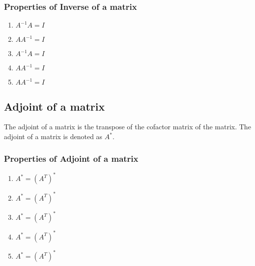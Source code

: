 \documentclass[titlepage,a4paper]{article}
\begin{document}
		\subsubsection{Properties of Inverse of a matrix}
			\begin{enumerate}
				\item $A^{-1}A=I$
				\item $AA^{-1}=I$
				\item $A^{-1}A=I$
				\item $AA^{-1}=I$
				\item $AA^{-1}=I$
			\end{enumerate}
	
	\subsection{Adjoint of a matrix}
		The adjoint of a matrix is the transpose of the cofactor matrix of the matrix. The adjoint of a matrix is denoted as $A^*$.
		\subsubsection{Properties of Adjoint of a matrix}
			\begin{enumerate}
				\item $A^* = (A^T)^*$
				\item $A^* = (A^T)^*$
				\item $A^* = (A^T)^*$
				\item $A^* = (A^T)^*$
				\item $A^* = (A^T)^*$
			\end{enumerate}
\end{document}
